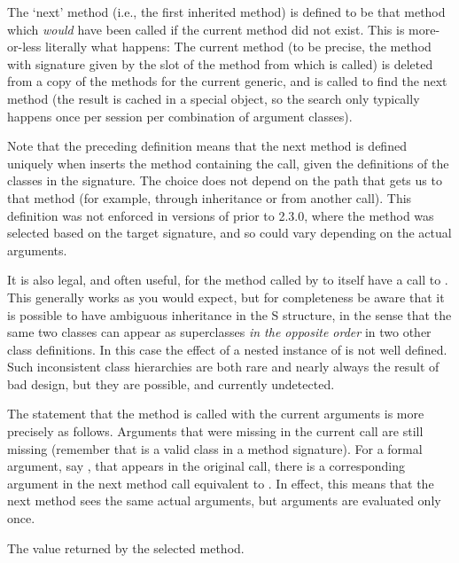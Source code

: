 %
\begin{Details}\relax
The `next' method (i.e., the first inherited method) is defined
to be that method which \emph{would} have been called if the current
method did not exist. This is more-or-less literally what happens: The
current method (to be precise, the method with signature given by the
 slot of the method from which  is
called) is deleted from a copy of the methods for the current generic,
and  is called to find the next method (the
result is cached in a special object, so the search only typically
happens once per session per combination of argument classes).

Note that the preceding definition means that the next method is
defined uniquely when  inserts the method containing
the  call, given the definitions of the classes
in the signature. The choice does not depend on the path that gets us
to that method (for example, through inheritance or from another
 call). This definition was not enforced in
versions of \R{} prior to 2.3.0, where the method was selected based on
the target signature, and so could vary depending on the actual
arguments.

It is also legal, and often useful, for the method called by
 to itself have a call to
. This generally works as you would expect, but
for completeness be aware that it is possible to have ambiguous
inheritance in the S structure, in the sense that the same two
classes can appear as superclasses \emph{in the opposite order} in
two other class definitions.  In this case the effect of a nested
instance of  is not well defined.  Such
inconsistent class hierarchies are both rare and nearly always the
result of bad design, but they are possible, and currently undetected.

The statement that the method is called with the current arguments is
more precisely as follows.  Arguments that were missing in the current
call are still missing (remember that  is a valid
class in a method signature).  For a formal argument, say , that
appears in the original call, there is a corresponding argument in the
next method call equivalent to .  In effect, this
means that the next method sees the same actual arguments, but
arguments are evaluated only once.
\end{Details}
%
\begin{Value}
The value returned by the selected method.
\end{Value}
